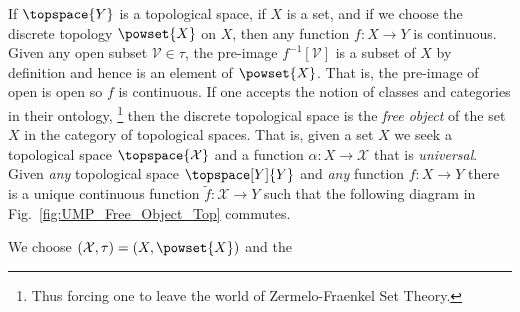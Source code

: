 \documentclass{book}                                                           %
\begin{document}
                \begin{example}
                    If $\topspace{Y}$ is a topological space, if $X$ is a set,
                    and if we choose the discrete topology $\powset{X}$ on $X$,
                    then any function $f:X\rightarrow{Y}$ is continuous. Given
                    any open subset $\mathcal{V}\in\tau$, the pre-image
                    $f^{\minus{1}}[\mathcal{V}]$ is a subset of $X$ by
                    definition and hence is an element of $\powset{X}$. That is,
                    the pre-image of open is open so $f$ is continuous. If one
                    accepts the notion of classes and categories in their
                    ontology,%
                    \footnote{%
                        Thus forcing one to leave the world of Zermelo-Fraenkel
                        Set Theory.%
                    }
                    then the discrete topological space is the
                    \textit{free object} of the set $X$ in the category of
                    topological spaces. That is, given a set $X$ we seek a
                    topological space $\topspace{\mathcal{X}}$ and a function
                    $\alpha:X\rightarrow\mathcal{X}$ that is \textit{universal}.
                    Given \textit{any} topological space $\topspace[Y]{Y}$ and
                    \textit{any} function $f:X\rightarrow{Y}$ there is a unique
                    continuous function $\tilde{f}:\mathcal{X}\rightarrow{Y}$
                    such that the following diagram in Fig.~\ref{fig:UMP_Free_Object_Top}
                    commutes.
                    \par\hfill\par
                    \hfill
                    \begin{minipage}[b]{0.588\textwidth}
                        We choose $(\mathcal{X},\tau)=(X,\powset{X})$ and the

\end{minipage}
\end{example}
\end{document}
